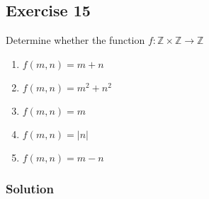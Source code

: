 \documentclass{article}
\theoremstyle{mytheoremstyle}
\theoremstyle{mytheoremstyle}
\theoremstyle{myproblemstyle}
\begin{document}
    \subsection*{Exercise 15}
        Determine whether the function \(f: \mathbb{Z} \times \mathbb{Z} \to \mathbb{Z}\)
        \begin{enumerate} [label = (\alph*)]
            \item \(f(m,n) = m + n\)
            \item \(f(m,n) = m^2 + n^2\)
            \item \(f(m,n) = m\)
            \item \(f(m,n) = |n|\)
            \item \(f(m,n) = m - n\)
        \end{enumerate}
    \subsubsection*{Solution}
\end{document}
